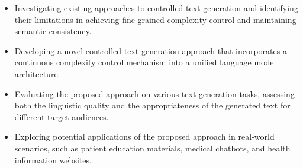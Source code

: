 \begin{itemize}
\item Investigating existing approaches to controlled text generation and identifying their limitations in achieving fine-grained complexity control and maintaining semantic consistency.
\item Developing a novel controlled text generation approach that incorporates a continuous complexity control mechanism into a unified language model architecture.
\item Evaluating the proposed approach on various text generation tasks, assessing both the linguistic quality and the appropriateness of the generated text for different target audiences.
\item Exploring potential applications of the proposed approach in real-world scenarios, such as patient education materials, medical chatbots, and health information websites.
\end{itemize}
